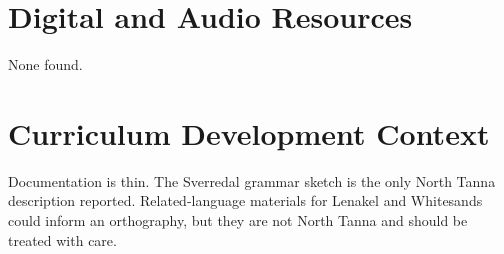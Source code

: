 \documentclass[12pt]{article}
\begin{document}
\section{Digital and Audio Resources}
None found.

\section{Curriculum Development Context}
Documentation is thin. The Sverredal grammar sketch is the only North Tanna description reported. Related-language materials for Lenakel and Whitesands could inform an orthography, but they are not North Tanna and should be treated with care.
\end{document}
